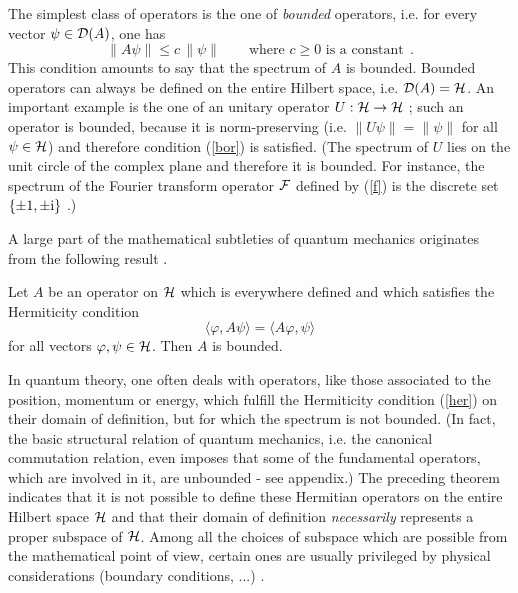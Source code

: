 \documentclass[12pt]{report}
\begin{document}
The simplest class of operators is the one of {\em bounded} 
operators, i.e. for every vector 
$\psi \in {\cal D}(A)$, one has 
\begin{equation}
\label{bor}
\| A  \psi \| \leq c \, \| \psi \|
\qquad \mbox{where $c\geq 0$ is a constant}
\ \ .
\end{equation}
This condition amounts to say that the spectrum of $A$ is bounded. 
Bounded operators can always be defined on the entire Hilbert space, 
i.e. ${\cal D}(A)= {\cal H}$. 
 An important example is the one of an unitary operator 
$U : {\cal H} \to {\cal H}$ ; such an operator is bounded, because
it is norm-preserving 
(i.e. $\| U  \psi \| = \| \psi \|$
 for all $\psi \in {\cal H}$) and therefore condition (\ref{bor})
is satisfied. (The spectrum of $U$ lies
on the unit circle of the complex plane and therefore it is bounded.
For instance, 
the spectrum of the Fourier transform operator ${\cal F}$ 
defined by (\ref{f}) is the discrete set $\{ \pm 1, \pm {\rm i} \}$ 
\cite{af,lio}.)
 
A large part of the mathematical subtleties of quantum mechanics
originates from the following result
\cite{sg, rs}.
\begin{theo}
   Let  $A$ be an operator on ${\cal H}$ which is everywhere defined 
   and which satisfies the Hermiticity condition 
\begin{equation}
\label{her}
\langle \varphi , A  \psi \rangle =
\langle A  \varphi  ,   \psi \rangle
\end{equation}
for all vectors $\varphi, \psi \in {\cal H}$.
Then $A$ is bounded.
\end{theo}
In quantum theory, one often deals with operators, like those 
associated to the position, momentum or energy, which fulfill the 
Hermiticity condition (\ref{her}) on their domain of definition,
but for which the spectrum is not bounded. 
(In fact, the basic structural relation of quantum mechanics, 
i.e. the canonical commutation relation, even imposes 
that some of the fundamental operators, which are involved in it,   
are unbounded - see appendix.) 
The preceding theorem
indicates that it is not possible to define these Hermitian 
operators on the entire Hilbert space ${\cal H}$ and that their
domain of definition {\em necessarily} 
represents a proper subspace of ${\cal H}$.
Among all the choices of subspace which are possible from 
the mathematical point of view, certain ones are usually privileged 
by physical considerations (boundary conditions, ...) 
\cite{aw,rs,sg,ber,th}.
\end{document}
